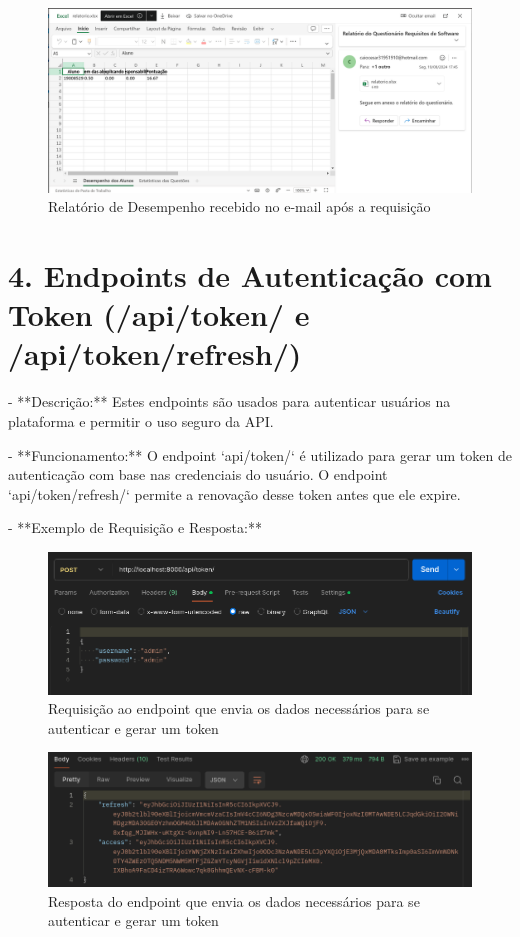 \begin{figure}[H]
    \centering
    \includegraphics[width=1\textwidth]{figuras/report_email.png}
    \caption{Relatório de Desempenho recebido no e-mail após a requisição}
    \label{fig:report_questions}
\end{figure}

\section*{4. Endpoints de Autenticação com Token (/api/token/ e /api/token/refresh/)}

- **Descrição:** Estes endpoints são usados para autenticar usuários na plataforma e permitir o uso seguro da API.

- **Funcionamento:** O endpoint `api/token/` é utilizado para gerar um token de autenticação com base nas credenciais do usuário. O endpoint `api/token/refresh/` permite a renovação desse token antes que ele expire.

- **Exemplo de Requisição e Resposta:**

\begin{figure}[H]
    \centering
    \includegraphics[width=1\textwidth]{figuras/token.png}
    \caption{Requisição ao endpoint que envia os dados necessários para se autenticar e gerar um token}
    \label{fig:report_questions}
\end{figure}

\begin{figure}[H]
    \centering
    \includegraphics[width=1\textwidth]{figuras/token_result.png}
    \caption{Resposta do endpoint que envia os dados necessários para se autenticar e gerar um token}
    \label{fig:report_questions}
\end{figure}

